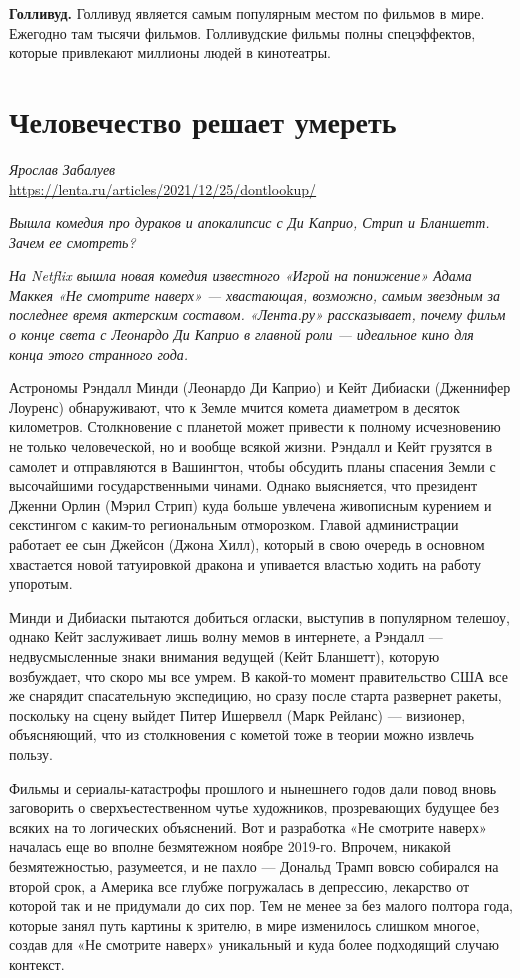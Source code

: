 \textbf{Голливуд.}
Голливуд является самым популярным местом по  фильмов в мире. Ежегодно там  тысячи фильмов. Голливудские фильмы полны спецэффектов, которые привлекают миллионы людей в кинотеатры.

\section{Человечество решает умереть}
\textit{Ярослав Забалуев}\\
\url{https://lenta.ru/articles/2021/12/25/dontlookup/}

{\it Вышла комедия про дураков и апокалипсис с Ди Каприо, Стрип и Бланшетт. Зачем ее смотреть?}

\textit{На Netflix вышла новая комедия известного «Игрой на понижение» Адама Маккея «Не смотрите наверх» --- хвастающая, возможно, самым звездным за последнее время актерским составом. «Лента.ру» рассказывает, почему фильм о конце света с Леонардо Ди Каприо в главной роли --- идеальное кино для конца этого странного года.}

Астрономы Рэндалл Минди (Леонардо Ди Каприо) и Кейт Дибиаски (Дженнифер Лоуренс) обнаруживают, что к Земле мчится комета диаметром в десяток километров. Столкновение с планетой может привести к полному исчезновению не только человеческой, но и вообще всякой жизни. Рэндалл и Кейт грузятся в самолет и отправляются в Вашингтон, чтобы обсудить планы спасения Земли с высочайшими государственными чинами. Однако выясняется, что президент Дженни Орлин (Мэрил Стрип) куда больше увлечена живописным курением и секстингом с каким-то региональным отморозком. Главой администрации работает ее сын Джейсон (Джона Хилл), который в свою очередь в основном хвастается новой татуировкой дракона и упивается властью ходить на работу упоротым.

Минди и Дибиаски пытаются добиться огласки, выступив в популярном телешоу, однако Кейт заслуживает лишь волну мемов в интернете, а Рэндалл --- недвусмысленные знаки внимания ведущей (Кейт Бланшетт), которую возбуждает, что скоро мы все умрем. В какой-то момент правительство США все же снарядит спасательную экспедицию, но сразу после старта развернет ракеты, поскольку на сцену выйдет Питер Ишервелл (Марк Рейланс) --- визионер, объясняющий, что из столкновения с кометой тоже в теории можно извлечь пользу.

Фильмы и сериалы-катастрофы прошлого и нынешнего годов дали повод вновь заговорить о сверхъестественном чутье художников, прозревающих будущее без всяких на то логических объяснений. Вот и разработка «Не смотрите наверх» началась еще во вполне безмятежном ноябре 2019-го. Впрочем, никакой безмятежностью, разумеется, и не пахло --- Дональд Трамп вовсю собирался на второй срок, а Америка все глубже погружалась в депрессию, лекарство от которой так и не придумали до сих пор. Тем не менее за без малого полтора года, которые занял путь картины к зрителю, в мире изменилось слишком многое, создав для «Не смотрите наверх» уникальный и куда более подходящий случаю контекст.

